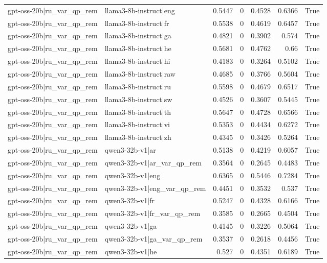 \begin{table}
\begin{tabular}{l l r r r r l}
gpt-oss-20b|ru_var_qp_rem & llama3-8b-instruct|eng & 0.5447 & 0 & 0.4528 & 0.6366 & True \\
gpt-oss-20b|ru_var_qp_rem & llama3-8b-instruct|fr & 0.5538 & 0 & 0.4619 & 0.6457 & True \\
gpt-oss-20b|ru_var_qp_rem & llama3-8b-instruct|ga & 0.4821 & 0 & 0.3902 & 0.574 & True \\
gpt-oss-20b|ru_var_qp_rem & llama3-8b-instruct|he & 0.5681 & 0 & 0.4762 & 0.66 & True \\
gpt-oss-20b|ru_var_qp_rem & llama3-8b-instruct|hi & 0.4183 & 0 & 0.3264 & 0.5102 & True \\
gpt-oss-20b|ru_var_qp_rem & llama3-8b-instruct|raw & 0.4685 & 0 & 0.3766 & 0.5604 & True \\
gpt-oss-20b|ru_var_qp_rem & llama3-8b-instruct|ru & 0.5598 & 0 & 0.4679 & 0.6517 & True \\
gpt-oss-20b|ru_var_qp_rem & llama3-8b-instruct|sw & 0.4526 & 0 & 0.3607 & 0.5445 & True \\
gpt-oss-20b|ru_var_qp_rem & llama3-8b-instruct|th & 0.5647 & 0 & 0.4728 & 0.6566 & True \\
gpt-oss-20b|ru_var_qp_rem & llama3-8b-instruct|vi & 0.5353 & 0 & 0.4434 & 0.6272 & True \\
gpt-oss-20b|ru_var_qp_rem & llama3-8b-instruct|zh & 0.4345 & 0 & 0.3426 & 0.5264 & True \\
gpt-oss-20b|ru_var_qp_rem & qwen3-32b-v1|ar & 0.5138 & 0 & 0.4219 & 0.6057 & True \\
gpt-oss-20b|ru_var_qp_rem & qwen3-32b-v1|ar_var_qp_rem & 0.3564 & 0 & 0.2645 & 0.4483 & True \\
gpt-oss-20b|ru_var_qp_rem & qwen3-32b-v1|eng & 0.6365 & 0 & 0.5446 & 0.7284 & True \\
gpt-oss-20b|ru_var_qp_rem & qwen3-32b-v1|eng_var_qp_rem & 0.4451 & 0 & 0.3532 & 0.537 & True \\
gpt-oss-20b|ru_var_qp_rem & qwen3-32b-v1|fr & 0.5247 & 0 & 0.4328 & 0.6166 & True \\
gpt-oss-20b|ru_var_qp_rem & qwen3-32b-v1|fr_var_qp_rem & 0.3585 & 0 & 0.2665 & 0.4504 & True \\
gpt-oss-20b|ru_var_qp_rem & qwen3-32b-v1|ga & 0.4145 & 0 & 0.3226 & 0.5064 & True \\
gpt-oss-20b|ru_var_qp_rem & qwen3-32b-v1|ga_var_qp_rem & 0.3537 & 0 & 0.2618 & 0.4456 & True \\
gpt-oss-20b|ru_var_qp_rem & qwen3-32b-v1|he & 0.527 & 0 & 0.4351 & 0.6189 & True \\

\end{tabular}
\end{table}
